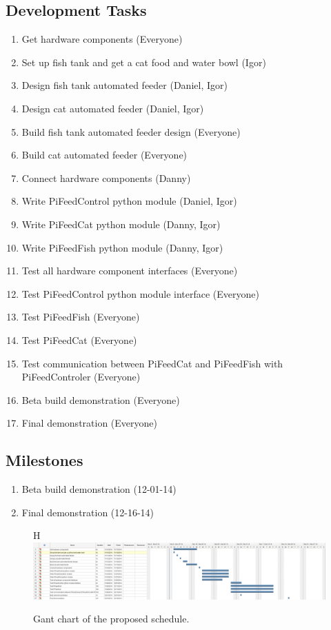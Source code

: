 \subsection{Development Tasks}
\begin{enumerate}
    \item Get hardware components (Everyone)
    \item Set up fish tank and get a cat food and water bowl (Igor)
    \item Design fish tank automated feeder (Daniel, Igor)
    \item Design cat automated feeder (Daniel, Igor)
    \item Build fish tank automated feeder design (Everyone)
    \item Build cat automated feeder (Everyone)
    \item Connect hardware components (Danny)
    \item Write PiFeedControl python module (Daniel, Igor)
    \item Write PiFeedCat python module (Danny, Igor)
    \item Write PiFeedFish python module (Danny, Igor)
    \item Test all hardware component interfaces (Everyone)
    \item Test PiFeedControl python module interface (Everyone)
    \item Test PiFeedFish (Everyone)
    \item Test PiFeedCat (Everyone)
    \item Test communication between PiFeedCat and PiFeedFish with
          PiFeedControler (Everyone)
    \item Beta build demonstration (Everyone)
    \item Final demonstration (Everyone)

\end{enumerate}

\subsection{Milestones}
\begin{enumerate}
    \item Beta build demonstration (12-01-14)
    \item Final demonstration (12-16-14)
\end{enumerate}

\begin{figure}{H}
    \centering
    \captionsetup{justification=centering, margin = 0.5cm}
    \includegraphics[scale=0.3]{images/Gant} 
    \caption{Gant chart of the proposed schedule.}
    \label{fig:gant}
\end{figure}



